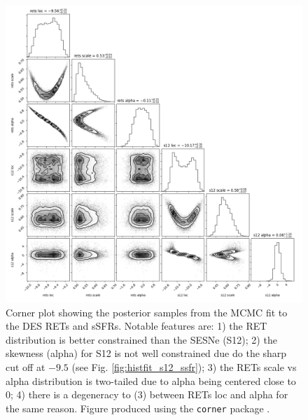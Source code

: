 \documentclass[fleqn,usenatbib,]{mnras}
\newcommand{\replychris}[1]{\color{magenta}#1 \color{black}}
\begin{document}
\begin{figure}
\includegraphics[width=\textwidth]{mc_figs/rets_s12_ssfr_corner_final.png}
\caption{\replychris{Corner plot showing the posterior samples from the MCMC fit to the DES RETs and \citet{Sanders2012} sSFRs. Notable features are: 1) the RET distribution is better constrained than the SESNe (S12); 2) the skewness (alpha) for S12 is not well constrained due do the sharp cut off at $-9.5$ (see Fig. \ref{fig:histfit_s12_ssfr}); 3) the RETs scale vs alpha distribution is two-tailed due to alpha being centered close to 0; 4) there is a degeneracy to (3) between RETs loc and alpha for the same reason. Figure produced using the \texttt{corner} package \citep{Foreman-Mackey2016}.}
\label{fig:corner}}
\end{figure}
\end{document}
